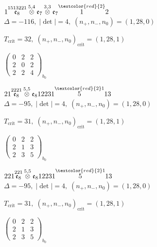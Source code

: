\documentclass[10pt]{article}
\begin{document}
$1\overset{1513221}{\mathfrak{e}_8}\overset{5,4}{\otimes}\mathfrak{e}_7\overset{3,3}{\otimes}\mathfrak{e}_7\overset{\textcolor{red}{2}}{1}2$ \quad $\Delta=-116,\; |\det|=4,\; (n_+,n_-,n_0)=(1,28,0)$

\hspace{1em}$T_{\text{crit}}=32,\; (n_+,n_-,n_0)_{\text{crit}}=(1,28,1)$

\hspace{2em}$\left(\begin{smallmatrix}0 & 2 & 2 \\ 2 & 0 & 2 \\ 2 & 2 & 4\end{smallmatrix}\right)_{\!b_0}$

\smallskip

$21\overset{2221}{\mathfrak{e}_8}\overset{5,5}{\otimes}\mathfrak{e}_812231\overset{\textcolor{red}{2}1}{5}13$ \quad $\Delta=-95,\; |\det|=4,\; (n_+,n_-,n_0)=(1,28,0)$

\hspace{1em}$T_{\text{crit}}=31,\; (n_+,n_-,n_0)_{\text{crit}}=(1,28,1)$

\hspace{2em}$\left(\begin{smallmatrix}0 & 2 & 2 \\ 2 & 1 & 3 \\ 2 & 3 & 5\end{smallmatrix}\right)_{\!b_0}$

\smallskip

$221\overset{221}{\mathfrak{e}_8}\overset{5,5}{\otimes}\mathfrak{e}_812231\overset{\textcolor{red}{2}1}{5}13$ \quad $\Delta=-95,\; |\det|=4,\; (n_+,n_-,n_0)=(1,28,0)$

\hspace{1em}$T_{\text{crit}}=31,\; (n_+,n_-,n_0)_{\text{crit}}=(1,28,1)$

\hspace{2em}$\left(\begin{smallmatrix}0 & 2 & 2 \\ 2 & 1 & 3 \\ 2 & 3 & 5\end{smallmatrix}\right)_{\!b_0}$

\smallskip
\end{document}
